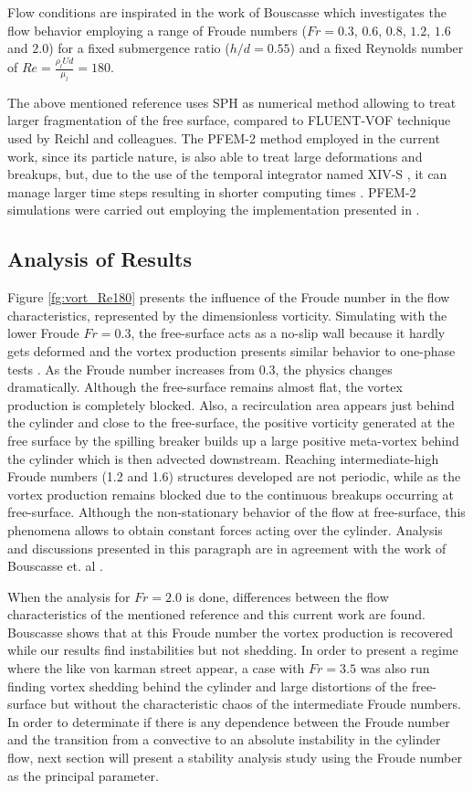 Flow conditions are inspirated in the work of Bouscasse \cite{Bouscasse14} which investigates the flow behavior employing a range of Froude numbers ($Fr=0.3$, $0.6$, $0.8$, $1.2$, $1.6$ and $2.0$) for a fixed submergence ratio ($h/d=0.55$) and a fixed Reynolds number of $Re=\frac{\rho_l U d}{\mu_l}=180$. 

The above mentioned reference uses SPH as numerical method allowing to treat larger fragmentation of the free surface, compared to FLUENT-VOF technique used by Reichl and colleagues. The PFEM-2 method employed in the current work, since its particle nature, is also able to treat large deformations and breakups, but, due to the use of the temporal integrator named XIV-S \cite{Idelsohn12}, it can manage larger time steps resulting in shorter computing times \cite{Gimenez2015186}. PFEM-2 simulations were carried out employing the implementation presented in \cite{Gimenez14}.

\subsection{Analysis of Results}

Figure \ref{fg:vort_Re180} presents the influence of the Froude number in the flow characteristics, represented by the dimensionless vorticity. Simulating with the lower Froude $Fr=0.3$, the free-surface acts as a no-slip wall because it hardly gets deformed and the vortex production presents similar behavior to one-phase tests \cite{PRICE2002175}. As the Froude number increases from 0.3, the physics changes dramatically. Although the free-surface remains almost flat, the vortex production is completely blocked. Also, a recirculation area appears just behind the cylinder and close to the free-surface, the positive vorticity generated at the free surface by the spilling breaker builds up a large positive meta-vortex behind the cylinder which is then advected downstream. Reaching intermediate-high Froude numbers (1.2 and 1.6) structures developed are not periodic, while as the vortex production remains blocked due to the continuous breakups occurring at free-surface. Although the non-stationary behavior of the flow at free-surface, this phenomena allows to obtain constant forces acting over the cylinder. Analysis and discussions presented in this paragraph are in agreement with the work of Bouscasse et. al \cite{Bouscasse14}.

When the analysis for $Fr=2.0$ is done, differences between the flow characteristics of the mentioned reference and this current work are found. Bouscasse shows that at this Froude number the vortex production is recovered while our results find instabilities but not shedding. In order to present a regime where the like von karman street appear, a case with $Fr=3.5$ was also run finding vortex shedding behind the cylinder and large distortions of the free-surface but without the characteristic chaos of the intermediate Froude numbers. In order to determinate if there is any dependence between the Froude number and the transition from a convective to an absolute instability in the cylinder flow, next section will present a stability analysis study using the Froude number as the principal parameter.



